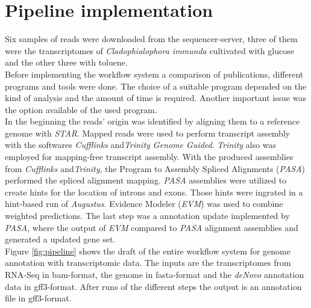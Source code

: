 \documentclass[12pt, a4paper]{report}
\begin{document}
\section{Pipeline implementation}
Six samples of reads were downloaded from the sequencer-server, three of them were the transcriptomes of \textit{Cladophialophora immunda} cultivated with glucose and the other three with toluene. \\
Before implementing the workflow system a comparison of publications, different programs and tools were done. The choice of a suitable program depended on the kind of analysis and the amount of time is required. Another important issue was the option available of the used program. \\
In the beginning the reads' origin was identified by aligning them to a reference genome with \textit{STAR}. Mapped reads were used to perform transcript assembly with the softwares \textit{Cufflinks} and\textit{Trinity Genome Guided}. \textit{Trinity} also was employed for mapping-free transcript assembly. With the produced assemblies from \textit{Cufflinks} and\textit{Trinity}, the Program to Assembly Spliced Alignments (\textit{PASA}) performed the spliced alignment mapping. \textit{PASA} assemblies were utilized to create hints for the location of introns and exons. Those hints were ingrated in a hint-based run of \textit{Augustus}. Evidence Modeler (\textit{EVM}) was used to combine weighted predictions. The last step was a annotation update implemented by \textit{PASA}, where the output of \textit{EVM} compared to \textit{PASA} alignment assemblies and generated a updated gene set. \cite{Haas2011, Steijger2013, Linde2015} \\
Figure \ref{fig:pipeline} shows the draft of the entire workflow system for genome annotation with transcriptomic data. The inputs are the transcriptomes from RNA-Seq in bam-format, the genome in fasta-format and the \textit{deNovo} annotation data in gff3-format. After runs of the different steps the output is an annotation file in gff3-format.
\end{document}
